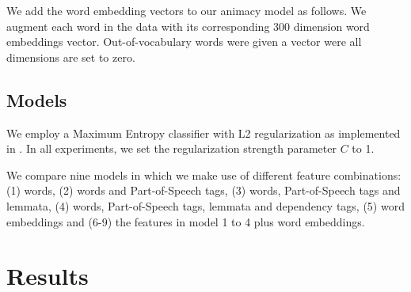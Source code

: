 \documentclass[a4paper,UKenglish]{oasics}
\begin{document}
We add the word embedding vectors to our animacy model as follows. We
augment each word in the data with its corresponding 300 dimension
word embeddings vector. Out-of-vocabulary words were given a vector were all
dimensions are set to zero.


\subsection{Models}
We employ a Maximum Entropy classifier with L2 regularization as
implemented in \cite{sklearn}. In all experiments, we set the
regularization strength parameter $C$ to 1.

We compare nine models in which we make use of different feature
combinations: (1) words, (2) words and Part-of-Speech tags, (3)
words, Part-of-Speech tags and lemmata, (4) words, Part-of-Speech
tags, lemmata and dependency tags, (5) word embeddings and (6-9) the
features in model 1 to 4 plus word embeddings.


\section{Results}\label{sec:results}
\end{document}
